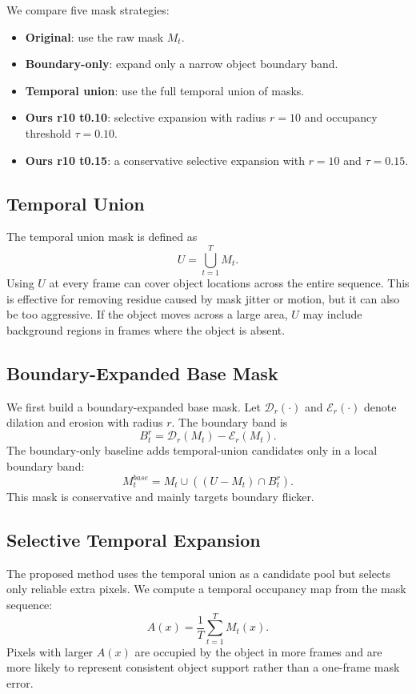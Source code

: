 \documentclass[nouppercase]{kaia}
\begin{document}
We compare five mask strategies:
\begin{itemize}
    \item \textbf{Original}: use the raw mask $M_t$.
    \item \textbf{Boundary-only}: expand only a narrow object boundary band.
    \item \textbf{Temporal union}: use the full temporal union of masks.
    \item \textbf{Ours r10 t0.10}: selective expansion with radius $r=10$ and occupancy threshold $\tau=0.10$.
    \item \textbf{Ours r10 t0.15}: a conservative selective expansion with $r=10$ and $\tau=0.15$.
\end{itemize}

\subsection{Temporal Union}
The temporal union mask is defined as
\begin{equation}
    U = \bigcup_{t=1}^{T} M_t.
\end{equation}
Using $U$ at every frame can cover object locations across the entire sequence. This is effective for removing residue caused by mask jitter or motion, but it can also be too aggressive. If the object moves across a large area, $U$ may include background regions in frames where the object is absent.

\subsection{Boundary-Expanded Base Mask}
We first build a boundary-expanded base mask. Let $\mathcal{D}_r(\cdot)$ and $\mathcal{E}_r(\cdot)$ denote dilation and erosion with radius $r$. The boundary band is
\begin{equation}
    B_t^r = \mathcal{D}_r(M_t) - \mathcal{E}_r(M_t).
\end{equation}
The boundary-only baseline adds temporal-union candidates only in a local boundary band:
\begin{equation}
    M_t^{base} = M_t \cup \left((U - M_t) \cap B_t^r \right).
\end{equation}
This mask is conservative and mainly targets boundary flicker.

\subsection{Selective Temporal Expansion}
The proposed method uses the temporal union as a candidate pool but selects only reliable extra pixels. We compute a temporal occupancy map from the mask sequence:
\begin{equation}
    A(x) = \frac{1}{T}\sum_{t=1}^{T} M_t(x).
\end{equation}
Pixels with larger $A(x)$ are occupied by the object in more frames and are more likely to represent consistent object support rather than a one-frame mask error.
\end{document}
